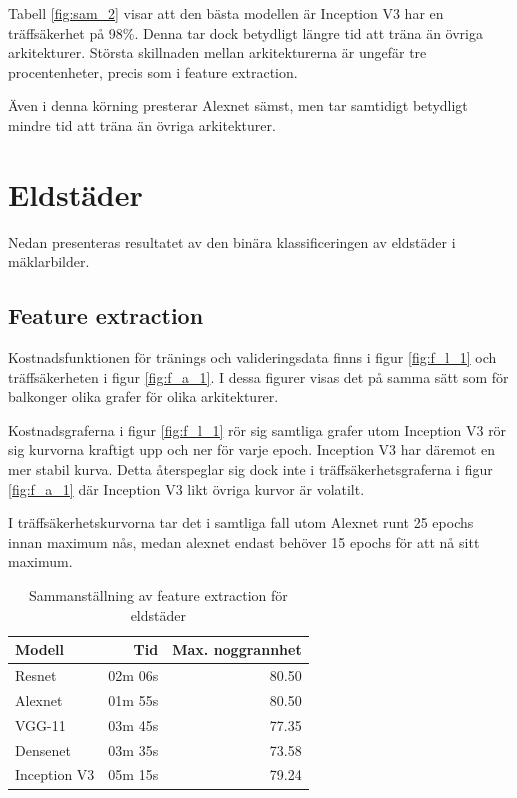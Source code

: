 \documentclass[]{kththesis}
\begin{document}
Tabell \ref{fig:sam_2} visar att den bästa modellen är Inception V3 har en träffsäkerhet på 98\%. 
Denna tar dock betydligt längre tid att träna än övriga arkitekturer. 
Största skillnaden mellan arkitekturerna är ungefär tre procentenheter, precis som i feature extraction.

Även i denna körning presterar Alexnet sämst, men tar samtidigt betydligt mindre tid att träna än övriga arkitekturer.


\section{Eldstäder}
Nedan presenteras resultatet av den binära klassificeringen av eldstäder i mäklarbilder.


\subsection{Feature extraction}
Kostnadsfunktionen för tränings och valideringsdata finns i figur \ref{fig:f_l_1} och träffsäkerheten i figur \ref{fig:f_a_1}.
I dessa figurer visas det på samma sätt som för balkonger olika grafer för olika arkitekturer.

Kostnadsgraferna i figur \ref{fig:f_l_1} rör sig samtliga grafer utom Inception V3 rör sig kurvorna kraftigt upp och ner för varje epoch. 
Inception V3 har däremot en mer stabil kurva. 
Detta återspeglar sig dock inte i träffsäkerhetsgraferna i figur \ref{fig:f_a_1} där Inception V3 likt övriga kurvor är volatilt.

I träffsäkerhetskurvorna tar det i samtliga fall utom Alexnet runt 25 epochs innan maximum nås, medan alexnet endast behöver 15 epochs för att nå sitt maximum.


\begin{table}[!htbp]
  \centering
  \begin{tabular}{|l|r|r|}
    Modell & Tid & Max. noggrannhet \\ 
    \hline
    Resnet       & 02m 06s & 80.50 \\
    Alexnet      & 01m 55s & 80.50 \\
    VGG-11       & 03m 45s & 77.35 \\
    Densenet     & 03m 35s & 73.58 \\
    Inception V3 & 05m 15s & 79.24 \\
  \end{tabular}
  \caption{Sammanställning av feature extraction för eldstäder}
  \label{fig:sam_3}
\end{table}
\end{document}

